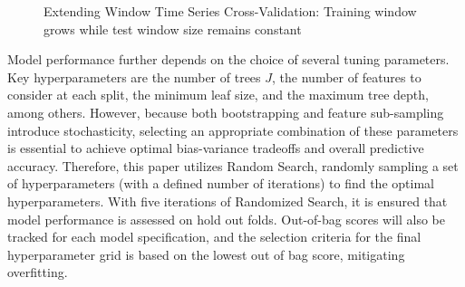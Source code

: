 \begin{figure}[H]
    \caption{Extending Window Time Series Cross-Validation: Training window grows while test window size remains constant}
    \end{figure}

Model performance further depends on the choice of several tuning parameters.  Key hyperparameters are the number of trees $J$, the number of features to consider at each split, the minimum leaf size, and the maximum tree depth, among others.  However, because both bootstrapping and feature sub-sampling introduce stochasticity, selecting an appropriate combination of these parameters is essential to achieve optimal bias-variance tradeoffs and overall predictive accuracy. Therefore, this paper utilizes Random Search, randomly sampling a set of hyperparameters (with a defined number of iterations) to find the optimal hyperparameters. With five iterations of Randomized Search, it is ensured that model performance is assessed on hold out folds. Out-of-bag scores will also be tracked for each model specification, and the selection criteria for the final hyperparameter grid is based on the lowest out of bag score, mitigating overfitting.

